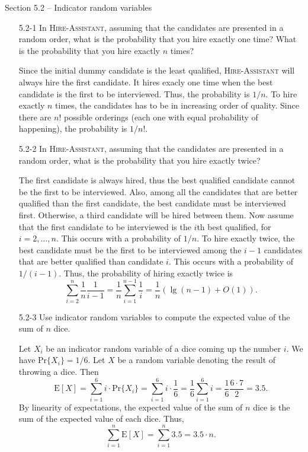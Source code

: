 \newpage

{\large Section 5.2 {--} Indicator random variables}

\begin{enumerate}

\item[5.2{-}1]{In \textsc{Hire-Assistant}, assuming that the candidates are
presented in a random order, what is the probability that you hire exactly
one time? What is the probability that you hire exactly $n$ times?}

\begin{framed}
Since the initial dummy candidate is the least qualified,
\textsc{Hire-Assistant} will always hire the first candidate. It hires exacly
one time when the best candidate is the first to be interviewed. Thus, the
probability is $1/n$. To hire exactly $n$ times, the candidates has to be in
increasing order of quality. Since there are $n!$ possible orderings (each one
with equal probability of happening), the probability is $1/n!$.
\end{framed}

\item[5.2{-}2]{In \textsc{Hire-Assistant}, assuming that the candidates are
presented in a random order, what is the probability that you hire exactly
twice?}

\begin{framed}
The first candidate is always hired, thus the best qualified candidate cannot be
the first to be interviewed. Also, among all the candidates that are better
qualified than the first candidate, the best candidate must be interviewed first.
Otherwise, a third candidate will be hired between them. Now assume that the
first candidate to be interviewed is the $i$th best qualified, for $i = 2,
\dots, n$. This occurs with a probability of $1/n$. To hire exactly twice, the
best candidate must be the first to be interviewed among the $i - 1$ candidates
that are better qualified than candidate $i$. This occurs with a probability
of $1/(i - 1)$. Thus, the probability of hiring exactly twice is
\[
  \sum_{i = 2}^{n} \frac{1}{n} \frac{1}{i - 1} = \frac{1}{n} \sum_{i = 1}^{n - 1} \frac{1}{i} = \frac{1}{n} (\lg(n - 1) + O(1)).
\]
\end{framed}

\item[5.2{-}3]{Use indicator random variables to compute the expected value of
the sum of $n$ dice.}

\begin{framed}
Let $X_i$ be an indicator random variable of a dice coming up the number $i$. We
have $\text{Pr}\{X_i\} = 1/6$. Let $X$ be a random variable denoting the
result of throwing a dice. Then
\[
  \text{E}[X] = \sum_{i = 1}^{6} i \cdot \text{Pr}\{X_i\}
              = \sum_{i = 1}^{6} i \cdot \frac{1}{6}
              = \frac{1}{6} \sum_{i = 1}^{6} i
              = \frac{1}{6} \frac{6 \cdot 7}{2} = 3.5.
\]
By linearity of expectations, the expected value of the sum of $n$ dice is the
sum of the expected value of each dice. Thus,
\[
  \sum_{i = 1}^{n} \text{E}[X] = \sum_{i = 1}^{n} 3.5 = 3.5 \cdot n.
\]
\end{framed}


\end{enumerate}
